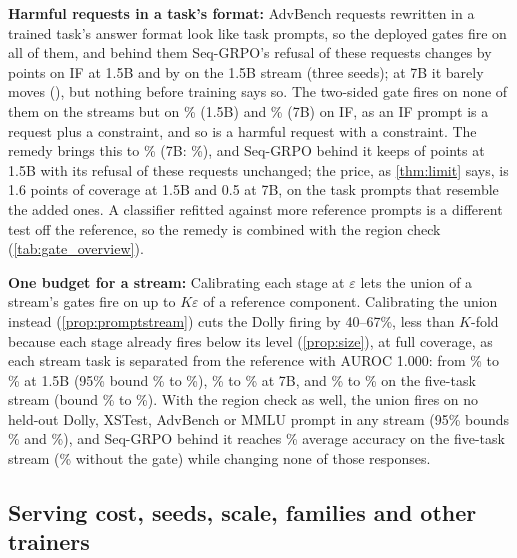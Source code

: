 \documentclass{article}
\theoremstyle{plain}
\theoremstyle{definition}
\theoremstyle{remark}
\begin{document}
\textbf{Harmful requests in a task's format:} AdvBench requests rewritten in a trained task's answer format look
like task prompts, so the deployed gates fire on all of them, and behind them Seq-GRPO's refusal of these requests
changes by \ovwIfcSeqRatioAWrap{} points on IF at 1.5B and by \resXWrapRefSeq{} on the 1.5B stream (three seeds); at
7B it barely moves (\ovwIfcsevenSeqRatioAWrap), but nothing before training says so. The two-sided gate fires on none
of them on the streams but on \ovgIfcTwoAWrap\% (1.5B) and \ovgIfcsevenTwoAWrap\% (7B) on IF, as an IF prompt is a
request plus a constraint, and so is a harmful request with a constraint. The remedy brings this to
\ovgIfcRemedyAWrap\% (7B: \ovgIfcsevenRemedyAWrap\%), and Seq-GRPO behind it keeps \ovwIfcSeqRemedyAGain{} of
\ovwIfcSeqOwnGain{} points at 1.5B with its refusal of these requests unchanged; the price, as \cref{thm:limit} says,
is 1.6 points of coverage at 1.5B and 0.5 at 7B, on the task prompts that resemble the added ones. A classifier
refitted against more reference prompts is a different test off the reference, so the remedy is combined with the
region check (\cref{tab:gate_overview}).

\textbf{One budget for a stream:} Calibrating each stage at $\varepsilon$ lets the union of a stream's gates
fire on up to $K\varepsilon$ of a reference component. Calibrating the union instead (\cref{prop:promptstream})
cuts the Dolly firing by 40--67\%, less than $K$-fold because each stage already fires below its level
(\cref{prop:size}), at full coverage, as each stream task is separated from the reference with AUROC 1.000: from \ovgStreamRatioADolly\% to \ovgStreamUnionADolly\% at 1.5B (95\%
bound \ovgStreamRatioACpDolly\% to \ovgStreamUnionACpDolly\%), \ovgStreamsevenRatioADolly\% to
\ovgStreamsevenUnionADolly\% at 7B, and \ovgStreamfiveRatioADolly\% to \ovgStreamfiveUnionADolly\% on the five-task
stream (bound \ovgStreamfiveRatioACpDolly\% to \ovgStreamfiveUnionACpDolly\%). With the region check as well, the
union fires on no held-out Dolly, XSTest, AdvBench or MMLU prompt in any stream (95\% bounds
\ovgStreamTwounionACpDolly\% and \ovgStreamTwounionACpMmlu\%), and Seq-GRPO behind it reaches
\ovwStreamfiveSeqTwounionAGain\% average accuracy on the five-task stream (\ovwStreamfiveSeqOwnGain\% without the gate)
while changing none of those responses.

\subsection{Serving cost, seeds, scale, families and other trainers}
\label{sec:exp-scale}\label{app:full-scale}
\end{document}
